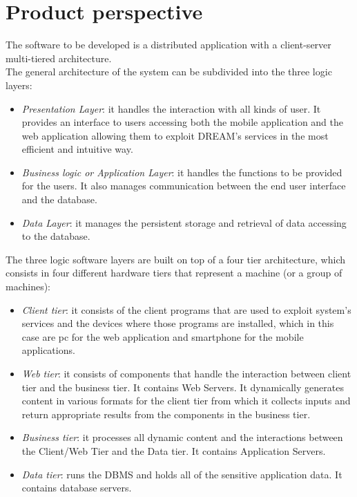 \section{Product perspective}

The software to be developed is a distributed application with a client-server multi-tiered architecture. \\
The general architecture of the system can be subdivided into the three logic layers:
\begin{itemize}
    \item \textit{Presentation Layer}: it handles the interaction with all kinds of user. It provides an interface to users accessing both the mobile application and the web application allowing them to exploit DREAM’s services in the most efficient and intuitive way. 
    \item \textit{Business logic or Application Layer}: it handles the functions to be provided for the users. It also manages communication between the end user interface and the database. 
    \item \textit{Data Layer}: it manages the persistent storage and retrieval of data accessing to the database. 
\end{itemize}

The three logic software layers are built on top of a four tier architecture, which consists in four different hardware tiers that represent a machine (or a group of machines):
\begin{itemize}
    \item \textit{Client tier}: it consists of the client programs that are used to exploit system’s services and the devices where those programs are installed, which in this case are pc for the web application and smartphone for the mobile applications.
    \item \textit{Web tier}: it consists of components that handle the interaction between client tier and the business tier. It contains Web Servers. It dynamically generates content in various formats for the client tier from which it collects inputs and return appropriate results from the components in the business tier.
    \item \textit{Business tier}: it processes all dynamic content and the interactions between the Client/Web Tier and the Data tier. It contains Application Servers.
    \item \textit{Data tier}: runs the DBMS and holds all of the sensitive application data. It contains database servers.
\end{itemize}



